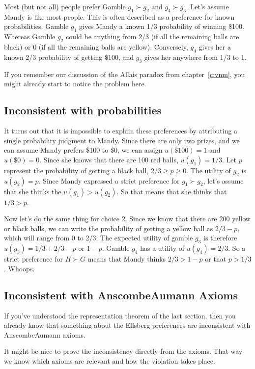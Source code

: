 Most (but not all) people prefer Gamble $g_1 \succ g_2$ and $g_4 \succ g_3$. Let's assume Mandy is like most people. This is often described as a preference for known probabilities.  Gamble $g_1$ gives Mandy a known 1/3 probability of winning \$100.  Whereas Gamble $g_2$ could be anything from 2/3 (if all the remaining balls are black) or 0 (if all the remaining balls are yellow).  Conversely, $g_4$ gives her a known 2/3 probability of getting \$100, and $g_3$ gives her anywhere from 1/3 to 1. 

If you remember our discussion of the Allais paradox from chapter~\ref{c:vnm}, you might already start to notice the problem here.  

\subsection{Inconsistent with probabilities}

It turns out that it is impossible to explain these preferences by attributing a single probability judgment to Mandy.  Since there are only two prizes, and we can assume Mandy prefers \$100 to \$0, we can assign $u(\$100) = 1$ and $u(\$0) = 0$.  Since she knows that there are 100 red balls, $u(g_1) = 1/3$.  Let $p$ represent the probability of getting a black ball, $2/3 \geq p \geq 0$.  The utility of $g_2$ is $u(g_2) = p$. Since Mandy expressed a strict preference for $g_1 \succ g_2$, let's assume that she thinks the $u(g_1) > u(g_2)$.  So that means that she thinks that $1/3 > p$. 

Now let's do the same thing for choice 2.  Since we know that there are 200 yellow or black balls, we can write the probability of getting a yellow ball as $2/3-p$, which will range from 0 to 2/3.  The expected utility of gamble $g_3$ is therefore $u(g_3) = 1/3 + 2/3 - p$ or $1-p$.  Gamble $g_4$ has a utility of $u(g_4) = 2/3$.  So a strict preference for $H \succ G$ means that Mandy thinks $2/3 > 1-p$ or that $p > 1/3$. Whoops.

\subsection{Inconsistent with Anscombe\breakslash Aumann Axioms}

If you've understood the representation theorem of the last section, then you already know that something about the Ellsberg preferences are inconsistent with Anscombe\breakslash Aumann axioms.  

It might be nice to prove the inconsistency directly from the axioms. That way we know which axioms are relevant and how the violation takes place.

